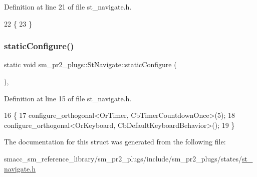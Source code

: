 Definition at line 21 of file st\+\_\+navigate.\+h.


\begin{DoxyCode}
22     \{
23     \}
\end{DoxyCode}
\mbox{\label{structsm__pr2__plugs_1_1StNavigate_a052e5c763e3e8d487f3dcaa2a9a2fab0}} 
\subsubsection{\texorpdfstring{static\+Configure()}{staticConfigure()}}
{\footnotesize\ttfamily static void sm\+\_\+pr2\+\_\+plugs\+::\+St\+Navigate\+::static\+Configure (\begin{DoxyParamCaption}{ }\end{DoxyParamCaption})\hspace{0.3cm}{\ttfamily [inline]}, {\ttfamily [static]}}



Definition at line 15 of file st\+\_\+navigate.\+h.


\begin{DoxyCode}
16     \{
17         configure\_orthogonal<OrTimer,  CbTimerCountdownOnce>(5);    
18         configure\_orthogonal<OrKeyboard, CbDefaultKeyboardBehavior>();
19     \}
\end{DoxyCode}


The documentation for this struct was generated from the following file\+:\begin{DoxyCompactItemize}
\item 
smacc\+\_\+sm\+\_\+reference\+\_\+library/sm\+\_\+pr2\+\_\+plugs/include/sm\+\_\+pr2\+\_\+plugs/states/\hyperlink{st__navigate_8h}{st\+\_\+navigate.\+h}\end{DoxyCompactItemize}
